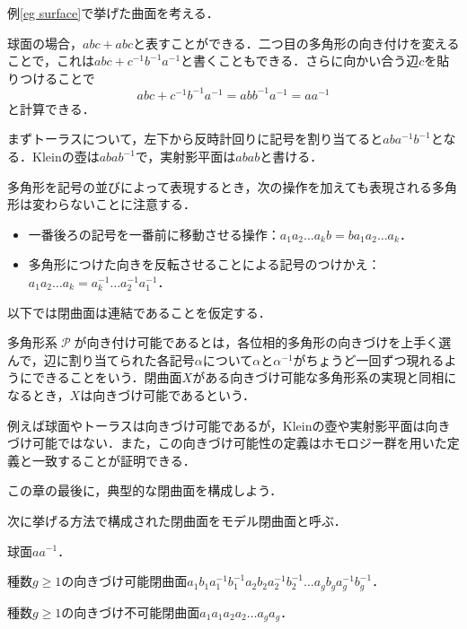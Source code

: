 \documentclass[dvipdfmx,uplatex]{jsarticle}
\begin{document}
\begin{example}
例\ref{eg surface}で挙げた曲面を考える．
\begin{enumarabicp}
\item 球面の場合，$abc+abc$と表すことができる．二つ目の多角形の向き付けを変えることで，これは$abc+c^{-1}b^{-1}a^{-1}$と書くこともできる．さらに向かい合う辺$c$を貼りつけることで
\[ abc+c^{-1}b^{-1}a^{-1}=abb^{-1}a^{-1}=aa^{-1} \]
と計算できる．
\item まずトーラスについて，左下から反時計回りに記号を割り当てると$aba^{-1}b^{-1}$となる．Kleinの壺は$abab^{-1}$で，実射影平面は$abab$と書ける．
\end{enumarabicp}
\end{example}

多角形を記号の並びによって表現するとき，次の操作を加えても表現される多角形は変わらないことに注意する．
\begin{itemize}
\item 一番後ろの記号を一番前に移動させる操作：$a_1a_2\dots a_kb=ba_1a_2\dots a_k$．
\item 多角形につけた向きを反転させることによる記号のつけかえ：$a_1a_2\dots a_k=a_k^{-1}\dots a_2^{-1}a_1^{-1}$．
\end{itemize}
以下では閉曲面は連結であることを仮定する．

\begin{definition}
多角形系$\mscrP$が向き付け可能であるとは，各位相的多角形の向きづけを上手く選んで，辺に割り当てられた各記号$\alpha$について$\alpha$と$\alpha^{-1}$がちょうど一回ずつ現れるようにできることをいう．閉曲面$X$がある向きづけ可能な多角形系の実現と同相になるとき，$X$は向きづけ可能であるという．
\end{definition}

例えば球面やトーラスは向きづけ可能であるが，Kleinの壺や実射影平面は向きづけ可能ではない．また，この向きづけ可能性の定義はホモロジー群を用いた定義と一致することが証明できる．

この章の最後に，典型的な閉曲面を構成しよう．

\begin{definition}\label{model surface}
次に挙げる方法で構成された閉曲面をモデル閉曲面と呼ぶ．
\begin{enumarabicp}
\item 球面$aa^{-1}$．
\item 種数$g\geq 1$の向きづけ可能閉曲面$a_1b_1a_1^{-1}b_1^{-1}a_2b_2a_2^{-1}b_2^{-1}\dots a_gb_ga_g^{-1}b_g^{-1}$．
\item 種数$g\geq 1$の向きづけ不可能閉曲面$a_1a_1a_2a_2\dots a_ga_g$．
\end{enumarabicp}
\end{definition}
\end{document}
